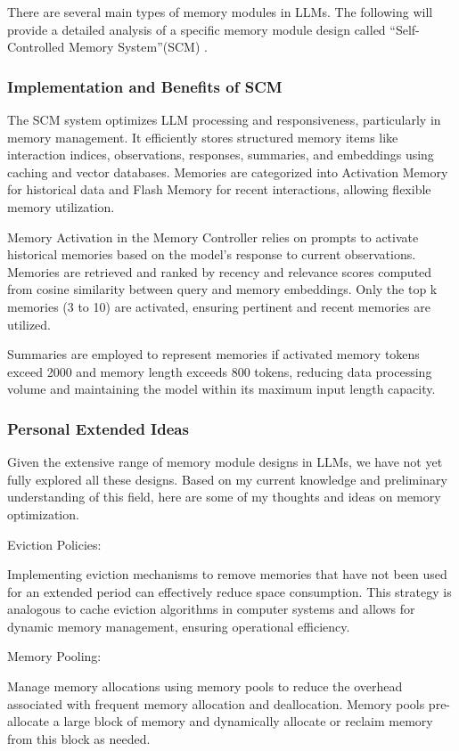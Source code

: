 \documentclass[conference]{IEEEtran}
\begin{document}
There are several main types of memory modules in LLMs. The following will provide a detailed analysis of a specific memory module design called “Self-Controlled Memory System”(SCM) \cite{b3}.

\subsubsection{Implementation and Benefits of SCM}
The SCM system optimizes LLM processing and responsiveness, particularly in memory management. It efficiently stores structured memory items like interaction indices, observations, responses, summaries, and embeddings using caching and vector databases. Memories are categorized into Activation Memory for historical data and Flash Memory for recent interactions, allowing flexible memory utilization.

Memory Activation in the Memory Controller relies on prompts to activate historical memories based on the model's response to current observations. Memories are retrieved and ranked by recency and relevance scores computed from cosine similarity between query and memory embeddings. Only the top k memories (3 to 10) are activated, ensuring pertinent and recent memories are utilized.

Summaries are employed to represent memories if activated memory tokens exceed 2000 and memory length exceeds 800 tokens, reducing data processing volume and maintaining the model within its maximum input length capacity.

\subsubsection{Personal Extended Ideas}
Given the extensive range of memory module designs in LLMs, we have not yet fully explored all these designs. Based on my current knowledge and preliminary understanding of this field, here are some of my thoughts and ideas on memory optimization.

Eviction Policies:

Implementing eviction mechanisms to remove memories that have not been used for an extended period can effectively reduce space consumption. This strategy is analogous to cache eviction algorithms in computer systems and allows for dynamic memory management, ensuring operational efficiency.

Memory Pooling:

Manage memory allocations using memory pools to reduce the overhead associated with frequent memory allocation and deallocation. Memory pools pre-allocate a large block of memory and dynamically allocate or reclaim memory from this block as needed.
\end{document}
